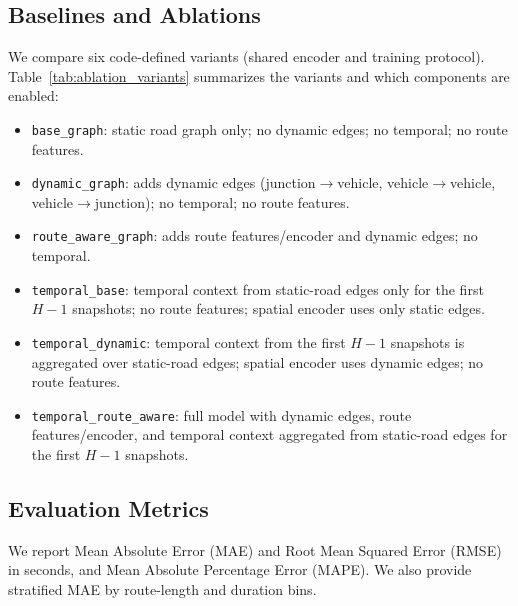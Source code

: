 \subsection{Baselines and Ablations}
We compare six code-defined variants (shared encoder and training protocol). Table~\ref{tab:ablation_variants} summarizes the variants and which components are enabled:
\begin{itemize}
    \item \texttt{base\_graph}: static road graph only; no dynamic edges; no temporal; no route features.
    \item \texttt{dynamic\_graph}: adds dynamic edges (junction$\to$vehicle, vehicle$\to$vehicle, vehicle$\to$junction); no temporal; no route features.
    \item \texttt{route\_aware\_graph}: adds route features/encoder and dynamic edges; no temporal.
    \item \texttt{temporal\_base}: temporal context from static-road edges only for the first $H{-}1$ snapshots; no route features; spatial encoder uses only static edges.
    \item \texttt{temporal\_dynamic}: temporal context from the first $H{-}1$ snapshots is aggregated over static-road edges; spatial encoder uses dynamic edges; no route features.
    \item \texttt{temporal\_route\_aware}: full model with dynamic edges, route features/encoder, and temporal context aggregated from static-road edges for the first $H{-}1$ snapshots.
\end{itemize}

\begin{table}[t]
    \centering
    \caption{Ablation variants and enabled components. Temporal uses a Transformer with static-road context for the first $H{-}1$ snapshots.}
    \label{tab:ablation_variants}
\end{table}

\subsection{Evaluation Metrics}
We report Mean Absolute Error (MAE) and Root Mean Squared Error (RMSE) in seconds, and Mean Absolute Percentage Error (MAPE). We also provide stratified MAE by route-length and duration bins.


